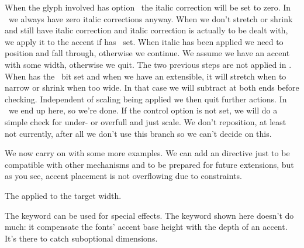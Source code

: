 \startitemize[n]
\startitem
    When the glyph involved has option \number\noitaliccorrectionclassoptioncode\
    the italic correction will be set to zero. In \CONTEXT\ we always have zero
    italic corrections anyway.
\stopitem
\startitem
    When we don't stretch or shrink and still have italic correction and
    italic correction is actually to be dealt with, we apply it to the accent
    if \type {\mathfontcontrol} has \number\applycharitalickernmathcontrolcode\
    set. When italic has been applied we need to position and fall through,
    otherwise we continue.
\stopitem
\startitem
    We assume we have an accent with some width, otherwise we quit. The two
    previous steps are not applied in \CONTEXT.
\stopitem
\startitem
    When \type {\mathfontcontrol} has the \number\extendaccentsmathcontrolcode\
    bit set and when we have an extensible, it will stretch when to narrow or
    shrink when too wide. In that case we will subtract \typ
    {\Umathaccentextendmargin} at both ends before checking. Independent of
    scaling being applied we then quit further actions. In \CONTEXT\ we end up
    here, so we're done.
\stopitem
\startitem
    If the control option is not set, we will do a simple check for under- or
    overfull and just scale. We don't reposition, at least not currently, after
    all we don't use this branch so we can't decide on this.
\stopitem
\stopitemize

We now carry on with some more examples. We can add an 
directive just to be compatible with other mechanisms and to be prepared for
future extensions, but as you see, accent placement is not overflowing due to
constraints.

\typebuffer[3][option=TEX]

\start \switchtobodyfont[pagella-nt] \getbuffer[3] \par \stop
\start \switchtobodyfont[pagella]    \getbuffer[3] \par \stop

The \type {fraction} applied to the target width.

\typebuffer[4][option=TEX]

\start \switchtobodyfont[pagella-nt] \getbuffer[4] \par \stop
\start \switchtobodyfont[pagella]    \getbuffer[4] \par \stop

The \type {overlay} keyword can be used for special effects. The 
keyword shown here doesn't do much: it compensate the fonts' accent base height
with the depth of an accent. It's there to catch suboptional dimensions.

